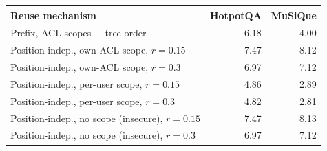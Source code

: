 \begin{tabular}{@{}l r r@{}}
\toprule
Reuse mechanism & HotpotQA & MuSiQue \\
\midrule
Prefix, ACL scopes + tree order & 6.18 & 4.00 \\
Position-indep., own-ACL scope, $r{=}0.15$ & 7.47 & 8.12 \\
Position-indep., own-ACL scope, $r{=}0.3$ & 6.97 & 7.12 \\
Position-indep., per-user scope, $r{=}0.15$ & 4.86 & 2.89 \\
Position-indep., per-user scope, $r{=}0.3$ & 4.82 & 2.81 \\
Position-indep., no scope (insecure), $r{=}0.15$ & 7.47 & 8.13 \\
Position-indep., no scope (insecure), $r{=}0.3$ & 6.97 & 7.12 \\
\bottomrule
\end{tabular}
